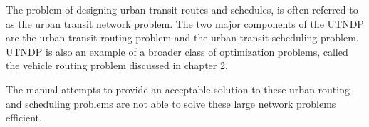 The problem of designing urban transit routes and schedules, is often referred to as the urban transit network problem. The two major components of the UTNDP are the urban transit routing problem and the urban transit scheduling problem. UTNDP is also an example of a broader class of optimization problems, called the vehicle routing problem discussed in chapter 2. 
\citep{fan09}

The manual attempts to provide an acceptable solution to these urban routing and scheduling problems are not able to solve these large network problems efficient.
















